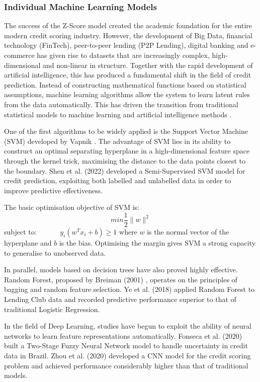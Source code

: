 \subsubsection{Individual Machine Learning Models}
\noindent
The success of the Z-Score model created the academic foundation for the entire modern credit scoring industry. However, the development of Big Data, financial technology (FinTech), peer-to-peer lending (P2P Lending), digital banking and e-commerce has given rise to datasets that are increasingly complex, high-dimensional and non-linear in structure. Together with the rapid development of artificial intelligence, this has produced a fundamental shift in the field of credit prediction. Instead of constructing mathematical functions based on statistical assumptions, machine learning algorithms allow the system to learn latent rules from the data automatically. This has driven the transition from traditional statistical models to machine learning and artificial intelligence methods \cite{hand1997statistical}.

One of the first algorithms to be widely applied is the Support Vector Machine (SVM) developed by Vapnik \cite{vapnik1998statistical}. The advantage of SVM lies in its ability to construct an optimal separating hyperplane in a high-dimensional feature space through the kernel trick, maximising the distance to the data points closest to the boundary. Shen et al. (2022) \cite{shen2022credit} developed a Semi-Supervised SVM model for credit prediction, exploiting both labelled and unlabelled data in order to improve predictive effectiveness.

The basic optimisation objective of SVM is:
$$min \frac{1}{2}\|w\|^2$$
subject to: $\quad \quad\quad y_i(w^T x_i + b) \geq 1$
\vspace{1em}
\noindent
where \(w\) is the normal vector of the hyperplane and \(b\) is the bias.
Optimising the margin gives SVM a strong capacity to generalise to unobserved data.

In parallel, models based on decision trees have also proved highly effective. Random Forest, proposed by Breiman (2001) \cite{breiman2001random}, operates on the principles of bagging and random feature selection. Ye et al. (2018) \cite{ye2018loan} applied Random Forest to Lending Club data and recorded predictive performance superior to that of traditional Logistic Regression.

In the field of Deep Learning, studies have begun to exploit the ability of neural networks to learn feature representations automatically. Fonseca et al. (2020) \cite{fonseca2020credit} built a Two-Stage Fuzzy Neural Network model to handle uncertainty in credit data in Brazil. Zhou et al. (2020) \cite{zhou2020credit} developed a CNN model for the credit scoring problem and achieved performance considerably higher than that of traditional models.

